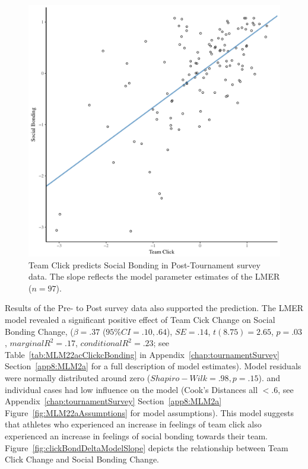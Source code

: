 \begin{CJK}{UTF8}{gbsn}
  \begin{figure}[htbp]
    \centering
  \includegraphics[scale=.5]{images/clickBondModelSlope.pdf}
    \caption{Team Click predicts Social Bonding in Post-Tournament survey data. The slope reflects the model parameter estimates of the LMER ($n = 97$).}
    \label{fig:clickBondModelSlope}
  \end{figure}



Results of the Pre- to Post survey data also supported the prediction.
The LMER model revealed a significant positive effect of Team Cick Change on Social Bonding Change, ($\beta = .37$ ($95\% CI =  .10, .64$), $SE = .14$, $t(8.75) = 2.65$, $p = .03$, $marginal R^2 = .17$, $conditional R^2 = .23$; see Table~\ref{tab:MLM22acClickcBonding} in Appendix~\ref{chap:tournamentSurvey} Section~\ref{app8:MLM2a} for a full description of model estimates).  Model residuals were normally distributed around zero ($Shapiro-Wilk = .98, p = .15$). and individual cases had low influence on the model (Cook's Distances all $< .6$, see Appendix~\ref{chap:tournamentSurvey} Section~\ref{app8:MLM2a} Figure~\ref{fig:MLM22aAssumptions} for model assumptions).  This model suggests that athletes who experienced an increase in feelings of team click also experienced an increase in feelings of social bonding towards their team.
Figure~\ref{fig:clickBondDeltaModelSlope} depicts the relationship between Team Click Change and Social Bonding Change.



\end{CJK}
